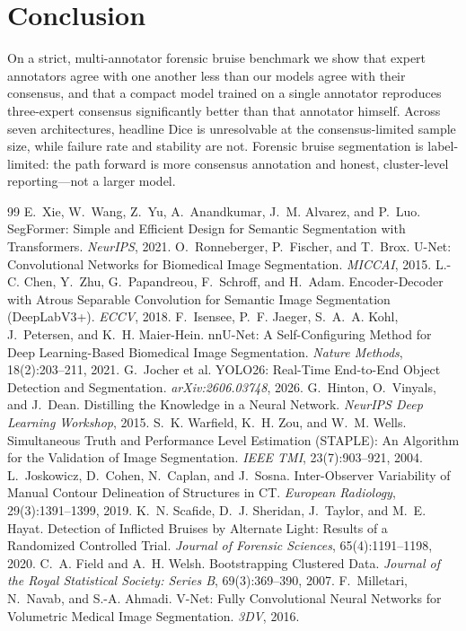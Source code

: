 \documentclass[letterpaper,twocolumn,10pt]{article}
\begin{document}
\section{Conclusion}
On a strict, multi-annotator forensic bruise benchmark we show that expert
annotators agree with one another less than our models agree with their consensus,
and that a compact model trained on a single annotator reproduces three-expert
consensus significantly better than that annotator himself. Across seven
architectures, headline Dice is unresolvable at the consensus-limited sample size,
while failure rate and stability are not. Forensic bruise segmentation is
label-limited: the path forward is more consensus annotation and honest,
cluster-level reporting---not a larger model.

\begin{thebibliography}{99}
\small
{} E.~Xie, W.~Wang, Z.~Yu, A.~Anandkumar, J.~M. Alvarez, and P.~Luo.
SegFormer: Simple and Efficient Design for Semantic Segmentation with Transformers.
\emph{NeurIPS}, 2021.
 O.~Ronneberger, P.~Fischer, and T.~Brox.
U-Net: Convolutional Networks for Biomedical Image Segmentation. \emph{MICCAI}, 2015.
 L.-C. Chen, Y.~Zhu, G.~Papandreou, F.~Schroff, and H.~Adam.
Encoder-Decoder with Atrous Separable Convolution for Semantic Image Segmentation
(DeepLabV3+). \emph{ECCV}, 2018.
 F.~Isensee, P.~F. Jaeger, S.~A.~A. Kohl, J.~Petersen, and K.~H. Maier-Hein.
nnU-Net: A Self-Configuring Method for Deep Learning-Based Biomedical Image
Segmentation. \emph{Nature Methods}, 18(2):203--211, 2021.
 G.~Jocher et al. YOLO26: Real-Time End-to-End Object Detection and
Segmentation. \emph{arXiv:2606.03748}, 2026.
 G.~Hinton, O.~Vinyals, and J.~Dean.
Distilling the Knowledge in a Neural Network. \emph{NeurIPS Deep Learning Workshop}, 2015.
 S.~K. Warfield, K.~H. Zou, and W.~M. Wells.
Simultaneous Truth and Performance Level Estimation (STAPLE): An Algorithm for the
Validation of Image Segmentation. \emph{IEEE TMI}, 23(7):903--921, 2004.
 L.~Joskowicz, D.~Cohen, N.~Caplan, and J.~Sosna.
Inter-Observer Variability of Manual Contour Delineation of Structures in CT.
\emph{European Radiology}, 29(3):1391--1399, 2019.
 K.~N. Scafide, D.~J. Sheridan, J.~Taylor, and M.~E. Hayat.
Detection of Inflicted Bruises by Alternate Light: Results of a Randomized
Controlled Trial. \emph{Journal of Forensic Sciences}, 65(4):1191--1198, 2020.
 C.~A. Field and A.~H. Welsh.
Bootstrapping Clustered Data. \emph{Journal of the Royal Statistical Society: Series B},
69(3):369--390, 2007.
 F.~Milletari, N.~Navab, and S.-A. Ahmadi.
V-Net: Fully Convolutional Neural Networks for Volumetric Medical Image
Segmentation. \emph{3DV}, 2016.
\end{thebibliography}
\end{document}
